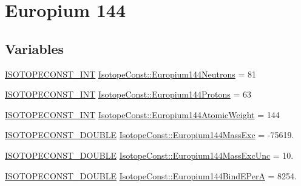 \hypertarget{group___isotope_const-_europium-_eu144}{}\section{Europium 144}
\label{group___isotope_const-_europium-_eu144}
\subsection*{Variables}
\begin{DoxyCompactItemize}
\item 
\mbox{\hyperlink{group___isotope_const-_macros_ga5f18360b3e99483a35c32d789e62621c}{I\+S\+O\+T\+O\+P\+E\+C\+O\+N\+S\+T\+\_\+\+I\+NT}} \mbox{\hyperlink{group___isotope_const-_europium-_eu144_ga193c437cf8fb2d6a3e3e584725fbf545}{Isotope\+Const\+::\+Europium144\+Neutrons}} = 81
\item 
\mbox{\hyperlink{group___isotope_const-_macros_ga5f18360b3e99483a35c32d789e62621c}{I\+S\+O\+T\+O\+P\+E\+C\+O\+N\+S\+T\+\_\+\+I\+NT}} \mbox{\hyperlink{group___isotope_const-_europium-_eu144_ga25ffe582faeed2949e7448828fef0beb}{Isotope\+Const\+::\+Europium144\+Protons}} = 63
\item 
\mbox{\hyperlink{group___isotope_const-_macros_ga5f18360b3e99483a35c32d789e62621c}{I\+S\+O\+T\+O\+P\+E\+C\+O\+N\+S\+T\+\_\+\+I\+NT}} \mbox{\hyperlink{group___isotope_const-_europium-_eu144_gae588a85f1566033bd2425e816f3092d4}{Isotope\+Const\+::\+Europium144\+Atomic\+Weight}} = 144
\item 
\mbox{\hyperlink{group___isotope_const-_macros_ga8f45a7272ce02c0b4c65c44636ed719a}{I\+S\+O\+T\+O\+P\+E\+C\+O\+N\+S\+T\+\_\+\+D\+O\+U\+B\+LE}} \mbox{\hyperlink{group___isotope_const-_europium-_eu144_gaa15b38116e9fccb3b44d8105784d4016}{Isotope\+Const\+::\+Europium144\+Mass\+Exc}} = -\/75619.
\item 
\mbox{\hyperlink{group___isotope_const-_macros_ga8f45a7272ce02c0b4c65c44636ed719a}{I\+S\+O\+T\+O\+P\+E\+C\+O\+N\+S\+T\+\_\+\+D\+O\+U\+B\+LE}} \mbox{\hyperlink{group___isotope_const-_europium-_eu144_gaa1d18d030765949477a5becdcdcd69db}{Isotope\+Const\+::\+Europium144\+Mass\+Exc\+Unc}} = 10.
\item 
\mbox{\hyperlink{group___isotope_const-_macros_ga8f45a7272ce02c0b4c65c44636ed719a}{I\+S\+O\+T\+O\+P\+E\+C\+O\+N\+S\+T\+\_\+\+D\+O\+U\+B\+LE}} \mbox{\hyperlink{group___isotope_const-_europium-_eu144_ga182b7be7b0dadf42f1bcff5bb3ea725c}{Isotope\+Const\+::\+Europium144\+Bind\+E\+PerA}} = 8254.
\item 

\end{DoxyCompactItemize}
